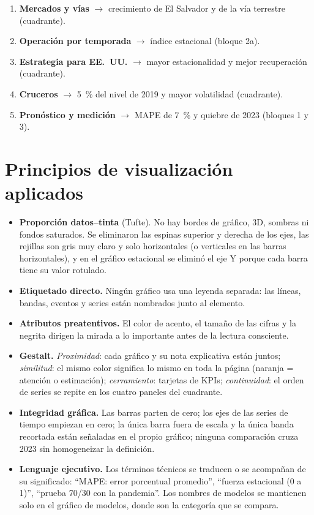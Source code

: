 \documentclass[12pt,letterpaper]{article}
\begin{document}
\begin{enumerate}[leftmargin=1.6em,itemsep=2pt]
  \item \textbf{Mercados y vías} $\rightarrow$ crecimiento de El Salvador y de la vía terrestre
  (cuadrante).
  \item \textbf{Operación por temporada} $\rightarrow$ índice estacional (bloque 2a).
  \item \textbf{Estrategia para EE.~UU.} $\rightarrow$ mayor estacionalidad y mejor recuperación
  (cuadrante).
  \item \textbf{Cruceros} $\rightarrow$ 5~\% del nivel de 2019 y mayor volatilidad (cuadrante).
  \item \textbf{Pronóstico y medición} $\rightarrow$ MAPE de 7~\% y quiebre de 2023 (bloques 1 y 3).
\end{enumerate}

\section{Principios de visualización aplicados}

\begin{itemize}[leftmargin=1.4em,itemsep=3pt]
  \item \textbf{Proporción datos--tinta} (Tufte). No hay bordes de gráfico, 3D, sombras ni
  fondos saturados. Se eliminaron las espinas superior y derecha de los ejes, las rejillas son
  gris muy claro y solo horizontales (o verticales en las barras horizontales), y en el gráfico
  estacional se eliminó el eje Y porque cada barra tiene su valor rotulado.
  \item \textbf{Etiquetado directo.} Ningún gráfico usa una leyenda separada: las líneas, bandas,
  eventos y series están nombrados junto al elemento.
  \item \textbf{Atributos preatentivos.} El color de acento, el tamaño de las cifras y la negrita
  dirigen la mirada a lo importante antes de la lectura consciente.
  \item \textbf{Gestalt.} \textit{Proximidad}: cada gráfico y su nota explicativa están juntos;
  \textit{similitud}: el mismo color significa lo mismo en toda la página (naranja = atención o
  estimación); \textit{cerramiento}: tarjetas de KPIs; \textit{continuidad}: el orden de series
  se repite en los cuatro paneles del cuadrante.
  \item \textbf{Integridad gráfica.} Las barras parten de cero; los ejes de las series de tiempo
  empiezan en cero; la única barra fuera de escala y la única banda recortada están señaladas en
  el propio gráfico; ninguna comparación cruza 2023 sin homogeneizar la definición.
  \item \textbf{Lenguaje ejecutivo.} Los términos técnicos se traducen o se acompañan de su
  significado: ``MAPE: error porcentual promedio'', ``fuerza estacional (0 a 1)'', ``prueba 70/30
  con la pandemia''. Los nombres de modelos se mantienen solo en el gráfico de modelos, donde son
  la categoría que se compara.
\end{itemize}
\end{document}

